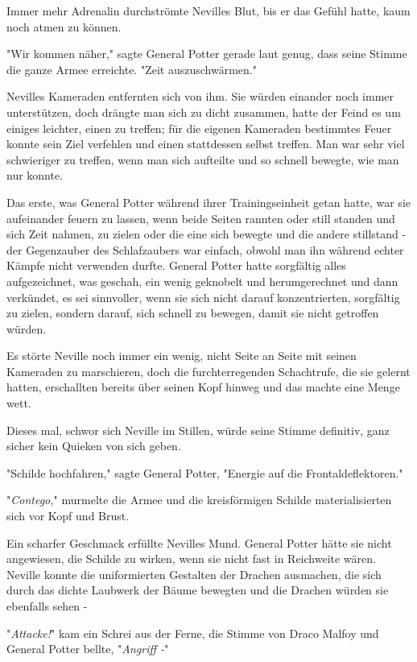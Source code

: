 {Immer mehr Adrenalin durchströmte Nevilles Blut, bis er das Gefühl hatte, kaum noch atmen zu können.

"Wir kommen näher," sagte General Potter gerade laut genug, dass seine Stimme die ganze Armee erreichte. "Zeit auszuschwärmen."

Nevilles Kameraden entfernten sich von ihm. Sie würden einander noch immer unterstützen, doch drängte man sich zu dicht zusammen, hatte der Feind es um einiges leichter, einen zu treffen; für die eigenen Kameraden bestimmtes Feuer konnte sein Ziel verfehlen und einen stattdessen selbst treffen. Man war sehr viel schwieriger zu treffen, wenn man sich aufteilte und so schnell bewegte, wie man nur konnte.

Das erste, was General Potter während ihrer Trainingseinheit getan hatte, war sie aufeinander feuern zu lassen, wenn beide Seiten rannten oder still standen und sich Zeit nahmen, zu zielen oder die eine sich bewegte und die andere stillstand - der Gegenzauber des Schlafzaubers war einfach, obwohl man ihn während echter Kämpfe nicht verwenden durfte. General Potter hatte sorgfältig alles aufgezeichnet, was geschah, ein wenig geknobelt und herumgerechnet und dann verkündet, es sei sinnvoller, wenn sie sich nicht darauf konzentrierten, sorgfältig zu zielen, sondern darauf, sich schnell zu bewegen, damit sie nicht getroffen würden.

Es störte Neville noch immer ein wenig, nicht Seite an Seite mit seinen Kameraden zu marschieren, doch die furchterregenden Schachtrufe, die sie gelernt hatten, erschallten bereits über seinen Kopf hinweg und das machte eine Menge wett.

Dieses mal, schwor sich Neville im Stillen, würde seine Stimme definitiv, ganz sicher kein Quieken von sich geben.

"Schilde hochfahren," sagte General Potter, "Energie auf die Frontaldeflektoren."

"\emph{Contego,}" murmelte die Armee und die kreisförmigen Schilde materialisierten sich vor Kopf und Brust.

Ein scharfer Geschmack erfüllte Nevilles Mund. General Potter hätte sie nicht angewiesen, die Schilde zu wirken, wenn sie nicht fast in Reichweite wären. Neville konnte die uniformierten Gestalten der Drachen ausmachen, die sich durch das dichte Laubwerk der Bäume bewegten und die Drachen würden sie ebenfalls sehen -

"\emph{Attacke!}" kam ein Schrei aus der Ferne, die Stimme von Draco Malfoy und General Potter bellte, "\emph{Angriff -}"

}
